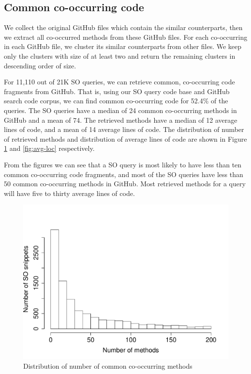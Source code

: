 \subsection{Common co-occurring code}

We collect the original GitHub files which contain the similar counterparts, then we extract all co-occurred methods from these GitHub files. For each co-occurring in each GitHub file, we cluster its similar counterparts from other files. We keep only the clusters with size of at least two and return the remaining clusters in descending order of size.

For 11,110 out of 21K SO queries, we can retrieve common, co-occurring code fragments from GitHub. That is, using our SO query code base and GitHub search code corpus, we can find common co-occurring code for 52.4\% of the queries. The SO queries have a median of 24 common co-occurring methods in GitHub and a mean of 74. The retrieved methods have a median of 12 average lines of code, and a mean of 14 average lines of code. The distribution of number of retrieved methods and distribution of average lines of code are shown in Figure \ref{fig:num-related} and \ref{fig:avg-loc} respectively.

From the figures we can see that a SO query is most likely to have less than ten common co-occurring code fragments, and most of the SO queries have less than 50 common co-occurring methods in GitHub. Most retrieved methods for a query will have five to thirty average lines of code.

\begin{figure}
	\includegraphics[scale=0.4]{figures/dist-related.pdf}
	\caption{Distribution of number of common co-occurring methods}
	\label{fig:num-related}
\end{figure}

